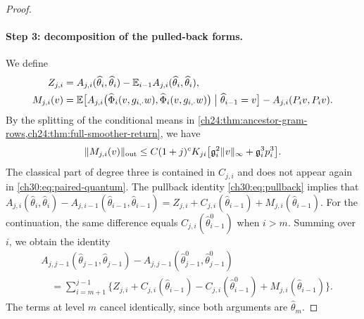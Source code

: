 \begin{proof}
\paragraph{Step 3: decomposition of the pulled-back forms.} We define
\begin{align*}
 Z_{j,i}&=A_{j,i}(\widehat\theta_i,\widehat\theta_i)-\mathbb E_{i-1}A_{j,i}(\widehat\theta_i,\widehat\theta_i),\\
 M_{j,i}(v)&=\mathbb E\bigl[A_{j,i}\bigl(\widehat\Phi_i(v,g_{i,\cdot}w),\widehat\Phi_i(v,g_{i,\cdot}w)\bigr)\bigm|\widehat\theta_{i-1}=v\bigr]-A_{j,i}(P_iv,P_iv).
\end{align*}
By the splitting of the conditional means in \cref{ch24:thm:ancestor-gram-rows,ch24:thm:full-smoother-return}, we have
\begin{equation}\label{ch30:eq:paired-quantum}
 \lVert M_{j,i}(v)\rVert_{\mathrm{out}}\le C(1+j)^cK_{ji}\bigl[\mathfrak g_i^2\lVert v\rVert_\infty+\mathfrak g_i^3p_i^3\bigr].
\end{equation}
The classical part of degree three is contained in $C_{j,i}$ and does not appear again in \eqref{ch30:eq:paired-quantum}. The pullback identity \eqref{ch30:eq:pullback} implies that $A_{j,i}(\widehat\theta_i,\widehat\theta_i)-A_{j,i-1}(\widehat\theta_{i-1},\widehat\theta_{i-1})=Z_{j,i}+C_{j,i}(\widehat\theta_{i-1})+M_{j,i}(\widehat\theta_{i-1})$. For the continuation, the same difference equals $C_{j,i}(\widehat\theta^0_{i-1})$ when $i>m$. Summing over $i$, we obtain the identity
\begin{equation}\label{ch30:eq:paired-ancestor}
 \begin{split}
 &A_{j,j-1}(\widehat\theta_{j-1},\widehat\theta_{j-1})-A_{j,j-1}(\widehat\theta_{j-1}^0,\widehat\theta_{j-1}^0)\\
 &\quad=\sum_{i=m+1}^{j-1}\bigl\{Z_{j,i}+C_{j,i}(\widehat\theta_{i-1})-C_{j,i}(\widehat\theta_{i-1}^0)+M_{j,i}(\widehat\theta_{i-1})\bigr\}.
 \end{split}
\end{equation}
The terms at level $m$ cancel identically, since both arguments are $\widehat\theta_m$.


\end{proof}
